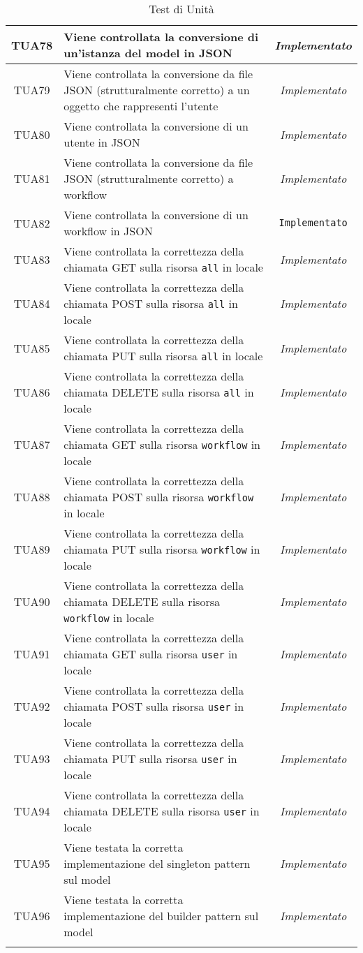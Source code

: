 \begin{longtable}{|c|m{12em}|c|}
TUA78 & Viene controllata la conversione di un'istanza del model in JSON& \textit{Implementato}\\ \hline
TUA79 & Viene controllata la conversione da file JSON (strutturalmente corretto) a un oggetto che rappresenti l'utente& \textit{Implementato}\\ \hline
TUA80 & Viene controllata la conversione di un utente in JSON& \textit{Implementato}\\ \hline
TUA81 & Viene controllata la conversione da file JSON (strutturalmente corretto) a workflow& \textit{Implementato}\\ \hline
TUA82 & Viene controllata la conversione di un workflow in JSON& \texttt{Implementato}\\ \hline
TUA83 & Viene controllata la correttezza della chiamata GET sulla risorsa \texttt{all} in locale& \textit{Implementato}\\ \hline
TUA84 & Viene controllata la correttezza della chiamata POST sulla risorsa \texttt{all} in locale& \textit{Implementato}\\ \hline
TUA85 & Viene controllata la correttezza della chiamata PUT sulla risorsa \texttt{all} in locale& \textit{Implementato}\\ \hline
TUA86 & Viene controllata la correttezza della chiamata DELETE sulla risorsa \texttt{all} in locale& \textit{Implementato}\\ \hline
TUA87 & Viene controllata la correttezza della chiamata GET sulla risorsa \texttt{workflow} in locale& \textit{Implementato}\\ \hline
TUA88 & Viene controllata la correttezza della chiamata POST sulla risorsa \texttt{workflow} in locale& \textit{Implementato}\\ \hline
TUA89 & Viene controllata la correttezza della chiamata PUT sulla risorsa \texttt{workflow} in locale& \textit{Implementato}\\ \hline
TUA90 & Viene controllata la correttezza della chiamata DELETE sulla risorsa \texttt{workflow} in locale& \textit{Implementato}\\ \hline
TUA91 & Viene controllata la correttezza della chiamata GET sulla risorsa \texttt{user} in locale& \textit{Implementato}\\ \hline
TUA92 & Viene controllata la correttezza della chiamata POST sulla risorsa \texttt{user} in locale& \textit{Implementato}\\ \hline
TUA93 & Viene controllata la correttezza della chiamata PUT sulla risorsa \texttt{user} in locale& \textit{Implementato}\\ \hline
TUA94 & Viene controllata la correttezza della chiamata DELETE sulla risorsa \texttt{user} in locale& \textit{Implementato}\\ \hline
TUA95 & Viene testata la corretta implementazione del singleton pattern sul model&  \textit{Implementato}\\ \hline
TUA96 & Viene testata la corretta implementazione del builder pattern sul model& \textit{Implementato}\\ \hline

\caption[Test di Unità]{Test di Unità}
\label{tabella:test2}
\end{longtable}
\clearpage

